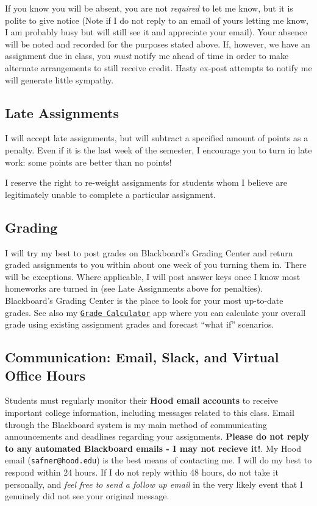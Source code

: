 \documentclass{article}
\begin{document}
If you know you will be absent, you are not \emph{required} to let me
know, but it is polite to give notice (Note if I do not reply to an
email of yours letting me know, I am probably busy but will still see it
and appreciate your email). Your absence will be noted and recorded for
the purposes stated above. If, however, we have an assignment due in
class, you \emph{must} notify me ahead of time in order to make
alternate arrangements to still receive credit. Hasty ex-post attempts
to notify me will generate little sympathy.

\hypertarget{late-assignments}{%
\subsection{Late Assignments}\label{late-assignments}}

I will accept late assignments, but will subtract a specified amount of
points as a penalty. Even if it is the last week of the semester, I
encourage you to turn in late work: some points are better than no
points!

I reserve the right to re-weight assignments for students whom I believe
are legitimately unable to complete a particular assignment.

\hypertarget{grading}{%
\subsection{Grading}\label{grading}}

I will try my best to post grades on Blackboard's Grading Center and
return graded assignments to you within about one week of you turning
them in. There will be exceptions. Where applicable, I will post answer
keys once I know most homeworks are turned in (see Late Assignments
above for penalties). Blackboard's Grading Center is the place to look
for your most up-to-date grades. See also my
\href{https://ryansafner.shinyapps.io/dev_grade_calculator/}{
\texttt{Grade\ Calculator}} app where you can calculate your overall
grade using existing assignment grades and forecast ``what if''
scenarios.

\hypertarget{communication-email-slack-and-virtual-office-hours}{%
\subsection{Communication: Email, Slack, and Virtual Office
Hours}\label{communication-email-slack-and-virtual-office-hours}}

Students must regularly monitor their \textbf{Hood email accounts} to
receive important college information, including messages related to
this class. Email through the Blackboard system is my main method of
communicating announcements and deadlines regarding your assignments.
\textbf{Please do not reply to any automated Blackboard emails - I may
not recieve it!}. My Hood email (\texttt{safner@hood.edu}) is the best
means of contacting me. I will do my best to respond within 24 hours. If
I do not reply within 48 hours, do not take it personally, and
\emph{feel free to send a follow up email} in the very likely event that
I genuinely did not see your original message.
\end{document}
